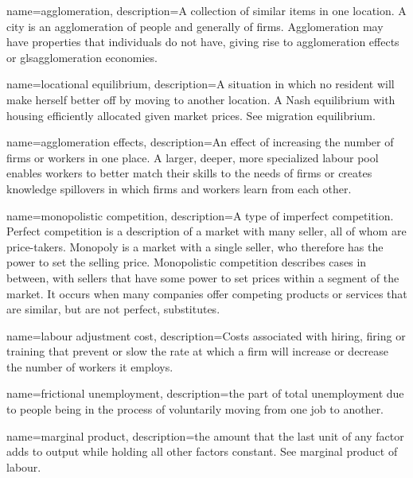 {
name=agglomeration,
description={A collection of similar items in one location. A city is an agglomeration of people and generally of firms. Agglomeration may have properties that individuals do not have, giving rise to \gls{agglomeration effects} or gls{agglomeration economies}.}
}

{
name=locational equilibrium,
description={A situation in which no resident will make herself better off by moving to another location. A Nash equilibrium with housing efficiently allocated  given market prices. See \gls{migration equilibrium}.}
}

{
name=agglomeration effects,
description={An effect of increasing the number of firms  or workers in one place. A larger, deeper, more specialized labour pool enables workers to better match their skills to the needs of firms or creates knowledge spillovers in which firms and workers learn from each other.}
}

{
name=monopolistic competition,
description={A type of  \gls{imperfect competition}. \gls{Perfect competition} is a description of a market with many seller, all of whom are price-takers. Monopoly is a market with a single seller, who therefore has the power to set the selling price. Monopolistic competition describes cases in between, with sellers that have some power to set prices within a segment of the market. It occurs when many companies offer competing products or services that are similar, but are not perfect, substitutes.}
}

{
name=labour adjustment cost,
description={Costs associated with hiring, firing or training that prevent or slow the rate at which a firm will increase or decrease the number of workers it employs.}
}

{
name=frictional unemployment,
description={the part of total unemployment  due to people being in the process of voluntarily moving from one job to another.}
}

{
name=marginal product,
description={the amount that the last unit of any factor  adds to output while holding all other factors constant. See \gls{marginal product of labour}.}
}




